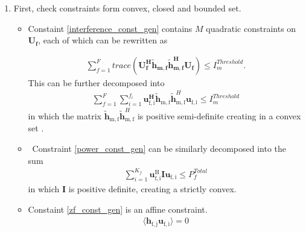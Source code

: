\documentclass[12pt,a4paper]{report}
\begin{document}
\begin{enumerate}


\item
First, check constraints form convex, closed and bounded set. 

\begin{itemize}

\item
	Constaint \eqref{interference_const_gen} contains $M$ quadratic constraints on $\mathbf{U_f}$, each of which 
	can be rewritten  as

\begin{gather*}
	\sum_{f=1}^F
	trace(\mathbf{U_f^H} \mathbf{\tilde{h}_{m,f}} \mathbf{\tilde{h}_{m,f}^H} \mathbf{U_f} )\leq 
	I^{Threshold}_{m}.
\end{gather*}
This can be further decomposed into  
	\begin{gather*}
	\sum_{f=1}^F
	\sum_{i=1}^{f_i}
	\mathbf{u_{\mathrm{f,i}}^H}\mathbf{\tilde{h}_{\mathrm{m,f}}} \mathbf{\tilde{h}}_{\mathrm{m,f}}^H
	\mathbf{u_{\mathrm{f,i}}} \leq I^{Threshold}_{m}
	\end{gather*}
in which the matrix $ \mathbf{\tilde{h}_{\mathrm{m,f}}} \mathbf{\tilde{h}}_{\mathrm{m,f}}^H$ is  positive semi-definite creating in a convex set 
\cite[p.~8,9]{BoV:04}. 


\item \
	Constraint \eqref{power_const_gen} can be similarly decomposed into the sum
	\begin{gather*}
		\sum_{i=1}^{K_f}\mathbf{u_{\mathrm{f,i}}^{\mathrm{H}}} \mathbf{I} 		
		\mathbf{u_{\mathrm{f,i}}} \leq  P^{Total}_{f}
	\end{gather*}
	in which $\mathbf{I}$ is positive definite, creating a strictly convex.

\item 
	Constaint \eqref{zf_const_gen} is an affine constraint. 
		\begin{gather*}
		\langle \mathbf{h_{\mathrm{f,j}}}\mathbf{u_{\mathrm{f,i}}} \rangle =0
		\end{gather*}
\end{itemize}



\end{enumerate}
\end{document}
